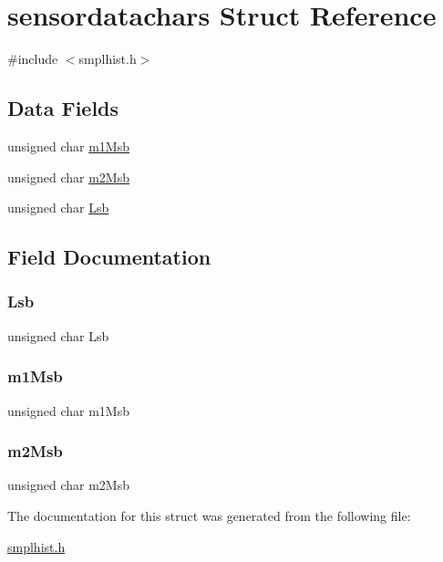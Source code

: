 \hypertarget{structsensordatachars}{}\section{sensordatachars Struct Reference}
\label{structsensordatachars}


{\ttfamily \#include $<$smplhist.\+h$>$}

\subsection*{Data Fields}
\begin{DoxyCompactItemize}
\item 
unsigned char \mbox{\hyperlink{structsensordatachars_a978b1d72dd059ccd2323ee66bea4d654}{m1\+Msb}}
\item 
unsigned char \mbox{\hyperlink{structsensordatachars_a030c938f5a438a3556f1887dfe72466f}{m2\+Msb}}
\item 
unsigned char \mbox{\hyperlink{structsensordatachars_afbfc01b26f853a9c35003e1c065db84f}{Lsb}}
\end{DoxyCompactItemize}


\subsection{Field Documentation}
\mbox{\label{structsensordatachars_afbfc01b26f853a9c35003e1c065db84f}} 
\subsubsection{\texorpdfstring{Lsb}{Lsb}}
{\footnotesize\ttfamily unsigned char Lsb}

\mbox{\label{structsensordatachars_a978b1d72dd059ccd2323ee66bea4d654}} 
\subsubsection{\texorpdfstring{m1\+Msb}{m1Msb}}
{\footnotesize\ttfamily unsigned char m1\+Msb}

\mbox{\label{structsensordatachars_a030c938f5a438a3556f1887dfe72466f}} 
\subsubsection{\texorpdfstring{m2\+Msb}{m2Msb}}
{\footnotesize\ttfamily unsigned char m2\+Msb}



The documentation for this struct was generated from the following file\+:\begin{DoxyCompactItemize}
\item 
\mbox{\hyperlink{smplhist_8h}{smplhist.\+h}}\end{DoxyCompactItemize}
